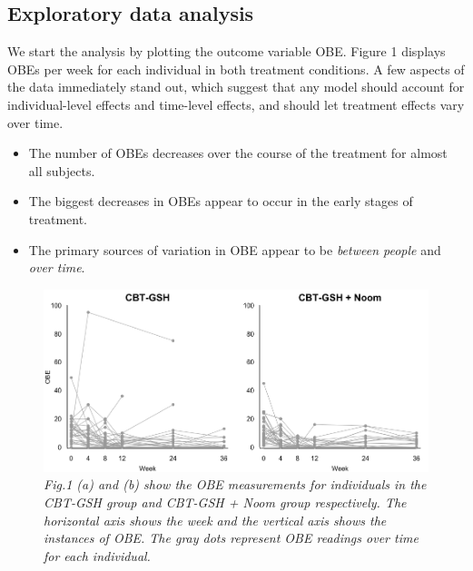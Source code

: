 \documentclass{article}
\begin{document}
\subsection*{Exploratory data analysis}
We start the analysis by plotting the outcome variable OBE. Figure 1 displays OBEs per week for each individual in both treatment conditions.  A few aspects of the data immediately stand out, which suggest that any model should account for individual-level effects and time-level effects, and should let treatment effects vary over time.  
\begin{itemize}
\item{The number of OBEs decreases over the course of the treatment for almost all subjects.}
\item{The biggest decreases in OBEs appear to occur in the early stages of treatment.}
\item{The primary sources of variation in OBE appear to be \emph{between people} and \emph{over time}.}
\end{itemize}
%
\begin{figure}[H]
   \begin{center}
\includegraphics[width=\textwidth, height=\textheight, keepaspectratio]{Noom_paths.png}
   \end{center}
\caption{\emph{Fig.1 (a) and (b) show the OBE measurements for individuals in the CBT-GSH group and CBT-GSH + Noom group respectively. The horizontal axis shows the week and the vertical axis shows the instances of OBE. The gray dots represent OBE readings over time for each individual. }}
\end{figure}
%
\end{document}
